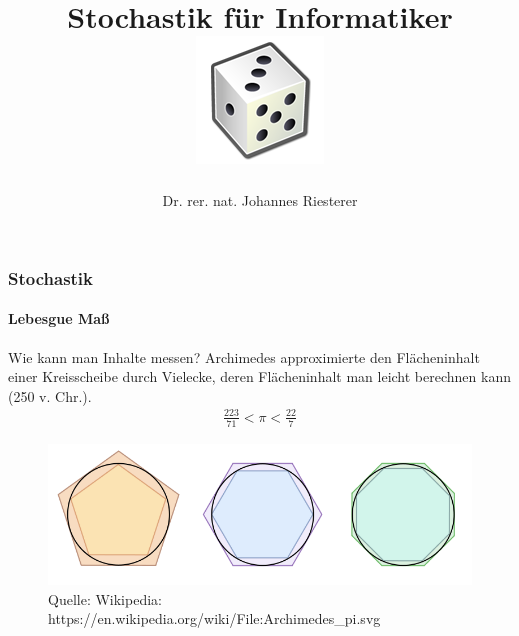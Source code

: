\documentclass{beamer}
\begin{document}
\title[Stochastik] %
{Stochastik für Informatiker
\\
\includegraphics[scale=0.5]{img/craps}
}
\subtitle{}
\author[Dr. Johannes Riesterer] %
{Dr.  rer. nat. Johannes Riesterer}

\date[KPT 2004] %
{}

\subject{Stochastik}







\begin{frame}
    \frametitle{Stochastik}
\framesubtitle{Lebesgue Maß}
    \begin{block}{Wie kann man Inhalte messen?}
Archimedes approximierte den Flächeninhalt einer Kreisscheibe durch Vielecke, deren Flächeninhalt man leicht berechnen kann (250 v. Chr.).
\begin{align*}
\frac{223}{71} < \pi < \frac{22}{7}
\end{align*}
\begin{figure}[H]
      \centering
    \includegraphics[width=0.7 \textwidth]{img/750px-Archimedes_pi}
      \caption{Quelle: Wikipedia: https://en.wikipedia.org/wiki/File:Archimedes\_pi.svg}
\end{figure}
\end{block}
 \end{frame}
\end{document}
